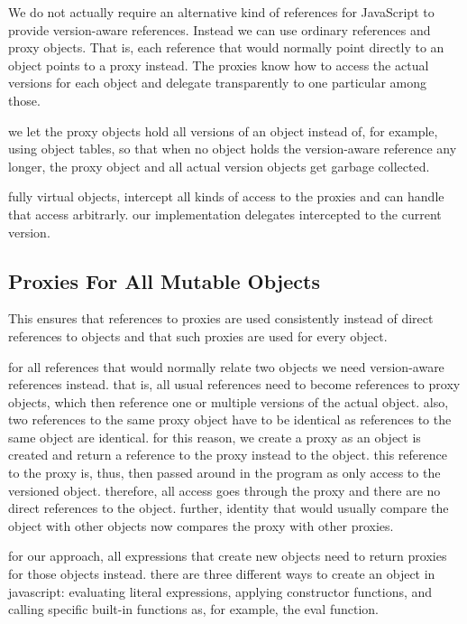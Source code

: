 We do not actually require an alternative kind of references for JavaScript to provide version-aware references.
Instead we can use ordinary references and proxy objects.
That is, each reference that would normally point directly to an object points to a proxy instead.
The proxies know how to access the actual versions for each object and delegate transparently to one particular among those.

we let the proxy objects hold all versions of an object instead of, for example, using object tables, so that when no object holds the version-aware reference any longer, the proxy object and all actual version objects get garbage collected.

fully virtual objects, intercept all kinds of access to the proxies and can handle that access arbitrarly.
our implementation delegates intercepted to the current version.



\subsection{Proxies For All Mutable Objects}

This ensures that references to proxies are used consistently instead of direct references to objects and that such proxies are used for every object.

for all references that would normally relate two objects we need version-aware references instead.
that is, all usual references need to become references to proxy objects, which then reference one or multiple versions of the actual object.
also, two references to the same proxy object have to be identical as references to the same object are identical.
for this reason, we create a proxy as an object is created and return a reference to the proxy instead to the object.
this reference to the proxy is, thus, then passed around in the program as only access to the versioned object.
therefore, all access goes through the proxy and there are no direct references to the object.
further, identity that would usually compare the object with other objects now compares the proxy with other proxies.

for our approach, all expressions that create new objects need to return proxies for those objects instead.
there are three different ways to create an object in javascript: evaluating literal expressions, applying constructor functions, and calling specific built-in functions as, for example, the eval function.

